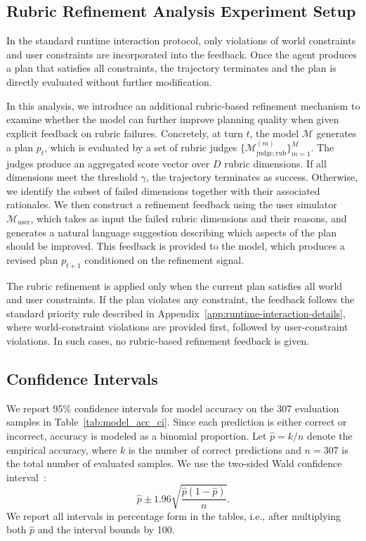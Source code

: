 \subsection{Rubric Refinement Analysis Experiment Setup}
\label{app:refine-rubrics-analysis-details}

In the standard runtime interaction protocol, only violations of world constraints and user constraints are incorporated into the feedback. Once the agent produces a plan that satisfies all constraints, the trajectory terminates and the plan is directly evaluated without further modification.

In this analysis, we introduce an additional rubric-based refinement mechanism to examine whether the model can further improve planning quality when given explicit feedback on rubric failures.
Concretely, at turn $t$, the model $\mathcal{M}$ generates a plan $p_t$, which is evaluated by a set of rubric judges $\{\mathcal{M}^{(m)}_{\mathrm{judge,rub}}\}_{m=1}^{M}$. 
The judges produce an aggregated score vector over $D$ rubric dimensions. 
If all dimensions meet the threshold $\gamma$, the trajectory terminates as success. 
Otherwise, we identify the subset of failed dimensions together with their associated rationales.
We then construct a refinement feedback using the user simulator $\mathcal{M}_{\mathrm{user}}$, which takes as input the failed rubric dimensions and their reasons, and generates a natural language suggestion describing which aspects of the plan should be improved. 
This feedback is provided to the model, which produces a revised plan $p_{t+1}$ conditioned on the refinement signal.

The rubric refinement is applied only when the current plan satisfies all world and user constraints. 
If the plan violates any constraint, the feedback follows the standard priority rule described in Appendix~\ref{app:runtime-interaction-details}, where world-constraint violations are provided first, followed by user-constraint violations. 
In such cases, no rubric-based refinement feedback is given.

\subsection{Confidence Intervals}
\label{app:CI}

We report 95\% confidence intervals for model accuracy on the 307 evaluation samples in Table~\ref{tab:model_acc_ci}. 
Since each prediction is either correct or incorrect, accuracy is modeled as a binomial proportion. Let $\hat{p} = k/n$ denote the empirical accuracy, where $k$ is the number of correct predictions and $n=307$ is the total number of evaluated samples. 
We use the two-sided Wald confidence interval~\citep{kahouadji2025comprehensivecomparisonwaldwilson}:
\begin{equation}
\hat{p} \pm 1.96 \sqrt{\frac{\hat{p}(1-\hat{p})}{n}}.
\end{equation}
We report all intervals in percentage form in the tables, i.e., after multiplying both $\hat{p}$ and the interval bounds by 100. 



